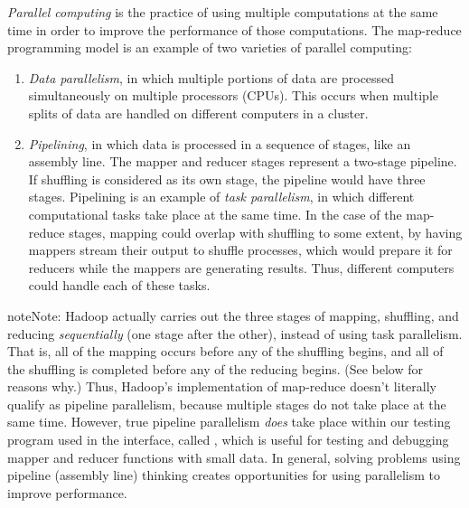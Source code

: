 \documentclass[letterpaper,10pt,openany,oneside]{sphinxmanual}
\begin{document}
\emph{Parallel computing} is the practice of using multiple computations
at the same time in order to improve the performance of those
computations. The map-reduce programming model is an example of two
varieties of parallel computing:
\begin{enumerate}
\item {} 
\emph{Data parallelism}, in which multiple portions of data are
processed simultaneously on multiple processors (CPUs). This occurs
when multiple splits of data are handled on different computers in
a cluster.

\item {} 
\emph{Pipelining}, in which data is processed in a sequence of
stages, like an assembly line. The mapper and reducer stages
represent a two-stage pipeline. If shuffling is considered as its
own stage, the pipeline would have three stages. Pipelining is an
example of \emph{task parallelism}, in which different computational
tasks take place at the same time. In the case of the map-reduce
stages, mapping could overlap with shuffling to some extent, by
having mappers stream their output to shuffle processes, which
would prepare it for reducers while the mappers are generating
results. Thus, different computers could handle each of these
tasks.

\end{enumerate}

\begin{notice}{note}{Note:}
Hadoop actually carries out the three stages of mapping,
shuffling, and reducing \emph{sequentially} (one stage after the other),
instead of using task parallelism. That is, all of the mapping
occurs before any of the shuffling begins, and all of the shuffling
is completed before any of the reducing begins. (See below for
reasons why.) Thus, Hadoop's implementation of map-reduce doesn't
literally qualify as pipeline parallelism, because multiple stages
do not take place at the same time. However, true pipeline
parallelism \emph{does} take place within our testing program used in
the  interface, called , which is useful
for testing and debugging mapper and reducer functions with small
data. In general, solving problems using pipeline (assembly line)
thinking creates opportunities for using parallelism to improve
performance.
\end{notice}
\end{document}
